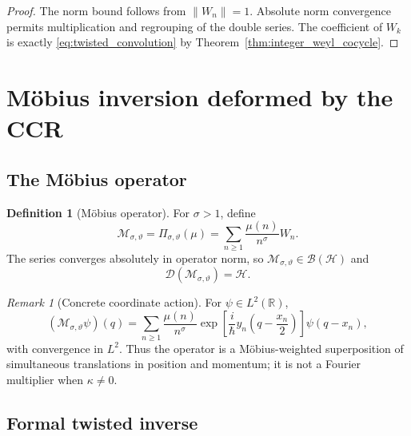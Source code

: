 \documentclass[11pt]{amsart}
\numberwithin{equation}{section}
\theoremstyle{plain}
\theoremstyle{definition}
\newtheorem{definition}[theorem]{Definition}
\theoremstyle{remark}
\newtheorem{remark}[theorem]{Remark}
\newcommand{\R}{\mathbb{R}}
\newcommand{\Hil}{\mathcal{H}}
\newcommand{\Dom}{\mathcal{D}}
\newcommand{\Bop}{\mathcal{B}}
\begin{document}
\begin{proof}
The norm bound follows from $\|W_n\|=1$.  Absolute norm convergence permits
multiplication and regrouping of the double series.  The coefficient of
$W_k$ is exactly \eqref{eq:twisted_convolution} by
Theorem~\ref{thm:integer_weyl_cocycle}.
\end{proof}

\section{M\"obius inversion deformed by the CCR}
\label{sec:mobius_inversion}

\subsection{The M\"obius operator}
\label{subsec:mobius_operator}

\begin{definition}[M\"obius operator]
\label{def:mobius_operator}
For $\sigma>1$, define
\begin{equation}
\mathcal M_{\sigma,\vartheta}
=
\Pi_{\sigma,\vartheta}(\mu)
=
\sum_{n\ge1}
\frac{\mu(n)}{n^{\sigma}}W_n.
\label{eq:mobius_operator}
\end{equation}
The series converges absolutely in operator norm, so
$\mathcal M_{\sigma,\vartheta}\in\Bop(\Hil)$ and
\begin{equation}
\Dom(\mathcal M_{\sigma,\vartheta})=\Hil.
\label{eq:mobius_operator_domain}
\end{equation}
\end{definition}

\begin{remark}[Concrete coordinate action]
\label{rem:mobius_coordinate_action}
For $\psi\in L^2(\R)$,
\begin{equation}
(\mathcal M_{\sigma,\vartheta}\psi)(q)
=
\sum_{n\ge1}
\frac{\mu(n)}{n^{\sigma}}
\exp\!\left[
\frac{i}{\hbar}y_n\left(q-\frac{x_n}{2}\right)
\right]
\psi(q-x_n),
\label{eq:mobius_coordinate_action}
\end{equation}
with convergence in $L^2$.  Thus the operator is a M\"obius-weighted
superposition of simultaneous translations in position and momentum; it is
not a Fourier multiplier when $\kappa\neq0$.
\end{remark}

\subsection{Formal twisted inverse}
\label{subsec:formal_twisted_inverse}
\end{document}
